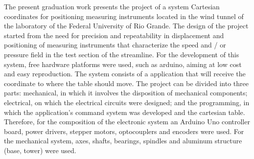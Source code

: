 The present graduation work presents the project of a system Cartesian coordinates 
for positioning measuring instruments located in the wind tunnel of the laboratory 
of the Federal University of Rio Grande. The design of the project started from the 
need for precision and repeatability in displacement and positioning of measuring 
instruments that characterize the speed and / or pressure field in the test section 
of the streamline. For the development of this system, free hardware platforms were 
used, such as arduino, aiming at low cost and easy reproduction. The system consists 
of a application that will receive the coordinate to where the table should move. 
The project can be divided into three parts: mechanical, in which it involves the 
disposition of mechanical components; electrical, on which the electrical circuits 
were designed; and the programming, in which the application's command system was 
developed and the cartesian table. Therefore, for the composition of the electronic 
system an Arduino Uno controller board, power drivers, stepper motors, optocouplers 
and encoders were used. For the mechanical system, axes, shafts, bearings, spindles 
and aluminum structure (base, tower) were used.

